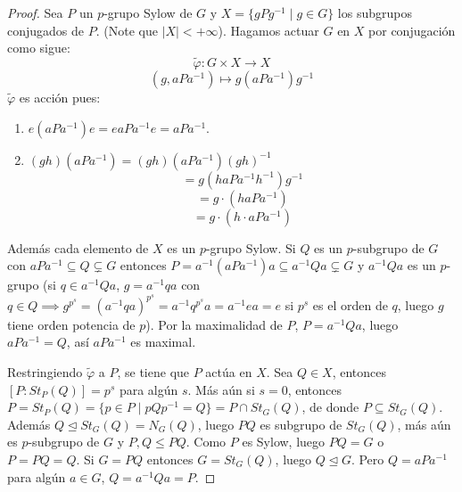 \begin{proof}
    Sea $P$ un $p$-grupo Sylow de $G$ y $X = \{gPg^{-1} \mid g \in G\}$ los subgrupos conjugados de $P$. (Note que $|X| < +\infty$). Hagamos actuar $G$ en $X$ por conjugación como sigue:
    \begin{equation*}
        \tilde{\varphi}: G \times X \to X
    \end{equation*}
    \begin{equation*}
        (g, aPa^{-1}) \mapsto g(aPa^{-1})g^{-1}
    \end{equation*}
    $\tilde{\varphi}$ es acción pues:
    \begin{enumerate}
        \item[i)] $e(aPa^{-1})e = e a P a^{-1} e = a P a^{-1}$.
        \item[ii)] $(gh)(aPa^{-1}) = (gh)(aPa^{-1})(gh)^{-1}$
        \begin{equation*}
            = g(h a P a^{-1} h^{-1})g^{-1}
        \end{equation*}
        \begin{equation*}
            = g \cdot (h a P a^{-1})
        \end{equation*}
        \begin{equation*}
            = g \cdot (h \cdot aPa^{-1})
        \end{equation*}
    \end{enumerate}
    Además cada elemento de $X$ es un $p$-grupo Sylow. Si $Q$ es un $p$-subgrupo de $G$ con $aPa^{-1} \subseteq Q \subsetneq G$ entonces $P = a^{-1}(aPa^{-1})a \subseteq a^{-1}Qa \subsetneq G$ y $a^{-1}Qa$ es un $p$-grupo (si $q \in a^{-1}Qa$, $g=a^{-1}qa$ con $q \in Q \implies g^{p^s} = (a^{-1}qa)^{p^s} = a^{-1}q^{p^s}a = a^{-1}ea = e$ si $p^s$ es el orden de $q$, luego $g$ tiene orden potencia de $p$). Por la maximalidad de $P$, $P = a^{-1}Qa$, luego $aPa^{-1} = Q$, así $aPa^{-1}$ es maximal.
    
    Restringiendo $\tilde{\varphi}$ a $P$, se tiene que $P$ actúa en $X$.
    Sea $Q \in X$, entonces $[P : St_P(Q)] = p^s$ para algún $s$. Más aún si $s=0$, entonces $P = St_P(Q) = \{p \in P \mid pQp^{-1} = Q\} = P \cap St_G(Q)$, de donde $P \subseteq St_G(Q)$. Además $Q \trianglelefteq St_G(Q) = N_G(Q)$, luego $PQ$ es subgrupo de $St_G(Q)$, más aún es $p$-subgrupo de $G$ y $P, Q \le PQ$.
    Como $P$ es Sylow, luego $PQ = G$ o $P = PQ = Q$. Si $G=PQ$ entonces $G=St_G(Q)$, luego $Q \trianglelefteq G$. Pero $Q = aPa^{-1}$ para algún $a \in G$, $Q = a^{-1}Qa = P$.
    

\end{proof}
